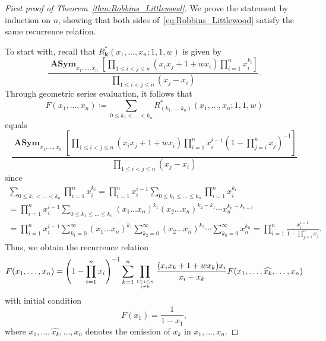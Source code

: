 \documentclass[ALCO, Unicode]{cedram}
\newcommand\myatop[2]{\genfrac{}{}{0pt}{}{#1}{#2}}
\DeclareMathOperator{\asym}{\mathbf{ASym}}
\newcommand{\boldk}{\boldsymbol{k}}
\begin{document}
	\begin{proof}[First proof of Theorem~\ref{thm:Robbins_Littlewood}]
		We prove the statement by induction on $n$, showing that both sides of~\eqref{eq:Robbins_Littlewood} satisfy the same recurrence relation.
		
		To start with, recall that $R_{\boldk}^{\ast}(x_{1},\ldots,x_{n};1,1,w)$ is given by
		\begin{equation*}
			\frac{\asym_{x_{1},\ldots,x_{n}}\left[\prod_{1\le i<j\le n}(x_{i}x_{j}+1+wx_{i})\prod_{i=1}^{n}x_{i}^{k_{i}}\right]}{\prod_{1\le i<j\le n}(x_{j}-x_{i})}.
		\end{equation*}
		Through geometric series evaluation, it follows that
		\begin{equation*}
			F(x_1,\ldots,x_n) \coloneqq \sum_{0 \le k_1 < \dots < k_n} R^{\ast}_{(k_{1},\ldots,k_{n})}(x_{1},\ldots,x_{n};1,1,w)
		\end{equation*} equals
		\begin{equation}\label{eq:asym_expression} 
			\frac{\asym_{x_{1},\ldots,x_{n}}\left[\prod_{1\le i<j\le n}(x_{i}x_{j}+1+wx_{i})\prod_{i=1}^{n}x_{i}^{i-1}(1-\prod_{j=i}^n x_j)^{-1}\right]}{\prod_{1\le i<j\le n}(x_{j}-x_{i})} 
		\end{equation}
		since 	
		\begin{multline*}
			\sum_{0 \le k_1 < \dots < k_n} \prod_{i=1}^{n} x_i^{k_i} =\prod_{i=1}^{n} x_i^{i-1} \sum_{0 \le k_1 \le \dots \le k_n} \prod_{i=1}^{n} x_i^{k_i} \\
			= \prod_{i=1}^{n} x_i^{i-1} \sum_{0 \le k_1 \le \dots \le k_n} (x_1 \dots x_n)^{k_1} (x_2 \dots x_n)^{k_2-k_1} \cdots x_n^{k_n-k_{n-1}}\\
			= \prod_{i=1}^{n} x_i^{i-1} \sum_{k_1=0}^{\infty} (x_1 \dots x_n)^{k_1} \sum_{k_2=0}^{\infty} (x_2 \dots x_n)^{k_2} \cdots  \sum_{k_n=0}^{\infty} x_n^{k_n} = \prod_{i=1}^{n} \frac{x_i^{i-1}}{1-\prod_{j=i}^{n} x_j}.
		\end{multline*}
		Thus, we obtain the recurrence relation
		\begin{equation}\label{eq:rec_Littlewood}
			F(x_1,\ldots,x_n) = 
			\left(1-\prod_{i=1}^n x_i \right)^{-1}  \sum\limits_{k=1}^n \prod\limits_{\myatop{1 \le i \le n}{i \neq k}} \frac{(x_i x_k+1+w x_k) x_i}{x_i-x_k}
			F(x_1,\ldots,\widehat{x_k},\ldots,x_n)
		\end{equation}
		with initial condition
		\begin{equation*}
			F(x_1)=\frac{1}{1-x_1},
		\end{equation*}
		where $x_1,\ldots,\widehat{x_k},\ldots,x_n$ denotes the omission of $x_k$ in $x_1,\ldots,x_n$. 
		

\end{proof}
\end{document}

